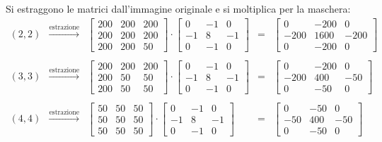 \documentclass[a4paper]{article}
\begin{document}
	\noindent
	Si estraggono le matrici dall'immagine originale e si moltiplica per la maschera:
	\begin{equation*}
		\begin{array}{lllll}
			\left(2,2\right) & \xrightarrow{\text{estrazione}} & \begin{bmatrix}
				200 & 200 & 200 \\
				200 & 200 & 200 \\
				200 & 200 &  50
			\end{bmatrix} \cdot \begin{bmatrix}
				0 & -1 & 0 \\
				-1 & 8 & -1 \\
				0 & -1 & 0
			\end{bmatrix} & = & \begin{bmatrix}
				0 & -200 & 0 \\
				-200 & 1600 & -200 \\
				0 & -200 & 0
			\end{bmatrix} \\
			\\
			\left(3,3\right) & \xrightarrow{\text{estrazione}} & \begin{bmatrix}
				200 & 200 & 200 \\
				200 &  50 &  50 \\
				200 &  50 &  50
			\end{bmatrix} \cdot \begin{bmatrix}
				0 & -1 & 0 \\
				-1 & 8 & -1 \\
				0 & -1 & 0
			\end{bmatrix} & = & \begin{bmatrix}
				0 & -200 & 0 \\
				-200 & 400 & -50 \\
				0 & -50 & 0
			\end{bmatrix} \\
			\\
			\left(4,4\right) & \xrightarrow{\text{estrazione}} & \begin{bmatrix}
				50 & 50 & 50 \\
				50 & 50 & 50 \\
				50 & 50 & 50
			\end{bmatrix} \cdot \begin{bmatrix}
				0 & -1 & 0 \\
				-1 & 8 & -1 \\
				0 & -1 & 0
			\end{bmatrix} & = & \begin{bmatrix}
				0 & -50 & 0 \\
				-50 & 400 & -50 \\
				0 & -50 & 0
			\end{bmatrix} \\
		\end{array}
	\end{equation*}
\end{document}
